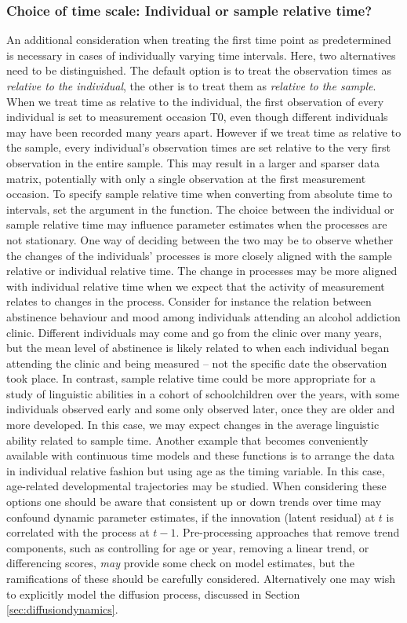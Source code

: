 \documentclass[nojss]{jss}\usepackage[]{graphicx}\usepackage[]{color}
\begin{document}
\subsubsection{Choice of time scale: Individual or sample relative time?}\nopagebreak
An additional consideration when treating the first time point as predetermined is necessary in cases of individually varying time intervals. Here, two alternatives need to be distinguished. The default option is to treat the observation times as \textit{relative to the individual}, the other is to treat them as \textit{relative to the sample}. When we treat time as relative to the individual, the first observation of every individual is set to measurement occasion T0, even though different individuals may have been recorded many years apart. However if we treat time as relative to the sample, every individual's observation times are set relative to the very first observation in the entire sample. This may result in a larger and sparser data matrix, potentially with only a single observation at the first measurement occasion.  To specify sample relative time when converting from absolute time to intervals, set the argument  in the  function. 
The choice between the individual or sample relative time may influence parameter estimates when the processes are not stationary. One way of deciding between the two may be to observe whether the changes of the individuals' processes is more closely aligned with the sample relative or individual relative time. The change in processes may be more aligned with individual relative time when we expect that the activity of measurement relates to changes in the process. Consider for instance the relation between abstinence behaviour and mood among individuals attending an alcohol addiction clinic. Different individuals may come and go from the clinic over many years, but the mean level of abstinence is likely related to when each individual began attending the clinic and being measured -- not the specific date the observation took place.  In contrast, sample relative time could be more appropriate for a study of linguistic abilities in a cohort of schoolchildren over the years, with some individuals observed early and some only observed later, once they are older and more developed. In this case, we may expect changes in the average linguistic ability related to sample time. Another example that becomes conveniently available with continuous time models and these functions is to arrange the data in individual relative fashion but using age as the timing variable. In this case, age-related developmental trajectories may be studied.
When considering these options one should be aware that consistent up or down trends over time may confound dynamic parameter estimates, if the innovation (latent residual) at $t$ is correlated with the process at $t-1$. Pre-processing approaches that remove trend components, such as controlling for age or year, removing a linear trend, or differencing scores, \textit{may} provide some check on model estimates, but the ramifications of these should be carefully considered. Alternatively one may wish to explicitly model the diffusion process, discussed in Section \ref{sec:diffusiondynamics}.
\end{document}
